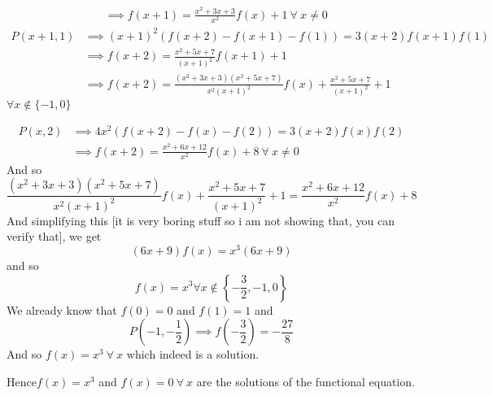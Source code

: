\documentclass[12pt]{article}
\begin{document}
{\begin{align*}
&\implies f(x + 1) = \frac {x^2 + 3x + 3}{x^2}f(x) + 1\ \forall\ x\ne 0
\end{align*}
\begin{align*}
P(x + 1,1)& \implies  (x+1)^2(f(x+2)-f(x+1)-f(1))=3(x+2)f(x+1)f(1) \\
&\implies f(x + 2) = \frac {x^2 + 5x + 7}{(x + 1)^2}f(x + 1) + 1\\
&\implies f(x + 2)= \frac {(x^2 + 3x + 3)(x^2 + 5x + 7)}{x^2(x + 1)^2}f(x) + \frac {x^2 + 5x + 7}{(x + 1)^2} + 1
\end{align*} $\forall x\notin\{ - 1,0\}$\par
\begin{align*}
P(x,2)& \implies 4x^2(f(x+2)-f(x)-f(2))=3(x+2)f(x)f(2)\\
&\implies f(x + 2) = \frac {x^2 + 6x + 12}{x^2}f(x) + 8\ \forall\ x\ne 0
\end{align*}
And so $$ \frac {(x^2 + 3x + 3)(x^2 + 5x + 7)}{x^2(x + 1)^2}f(x) + \frac {x^2 + 5x + 7}{(x + 1)^2} + 1 = \frac {x^2 + 6x + 12}{x^2}f(x) + 8$$And simplifying this [it is very boring stuff so i am not showing that, you can verify that], we get $$ (6x + 9)f(x) = x^3(6x + 9)$$ and so $$ f(x) = x^3 \forall x\notin\left\{ - \frac{3}{2}, - 1, 0\right\}$$We already know that $ f(0) = 0$ and $ f(1) = 1$ and $$ P\left(  - 1, - \frac{1}{2}\right) \implies f\left(  - \frac{3}{2}\right)  = - \frac{27}{8}$$And so $ f(x) = x^3\ \forall\ x$ which indeed is a solution.\par 
Hence$ f(x) = x^3$ and $f(x)=0\ \forall\ x$ are the solutions of the functional equation.}
\end{document}
